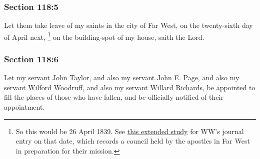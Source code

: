 	\subsubsection{Section 118:5} %
		\label{DC118-5}

		Let them take leave of my saints in the city of Far West, on the twenty-sixth day of April next,%
			\footnote{%
				So this would be 26 April 1839. See \hyperref[EXSS-DC118-WWJ]{this extended study} for WW's journal entry on that date, which records a council held by the apostles in Far West in preparation for their mission.
				} 
		on the building-spot of my house, saith the Lord.


	\subsubsection{Section 118:6} %
		\label{DC118-6}

		Let my servant John Taylor, and also my servant John E. Page, and also my servant Wilford Woodruff, and also my servant Willard Richards, be appointed to fill the places of those who have fallen, and be officially notified of their appointment.

